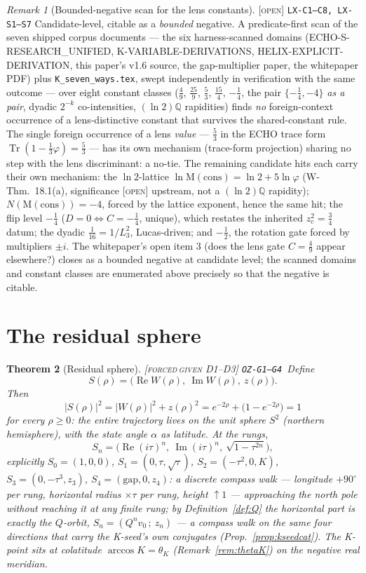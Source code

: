 \documentclass[11pt]{article}
\newcommand{\tagFD}{\textcolor{cF}{\textsc{[forced}}\,\textcolor{cD}{\textsc{given D1--D3]}}}
\newcommand{\tagO}{\textcolor{cO}{\textsc{[open]}}}
\newcommand{\hx}[1]{\textcolor{cC}{\footnotesize\texttt{#1}}}
\newcommand{\Q}{\mathbb{Q}}
\newcommand{\gp}{\varphi}
\newcommand{\gapc}{\mathrm{gap}}
\newcommand{\M}{\mathrm{M}}
\DeclareMathOperator{\Rea}{Re}
\DeclareMathOperator{\Ima}{Im}
\theoremstyle{plain}
\newtheorem{theorem}{Theorem}[section]
\theoremstyle{definition}
\theoremstyle{remark}
\newtheorem{remark}[theorem]{Remark}
\begin{document}
\begin{remark}[Bounded-negative scan for the lens constants]\label{rem:lensscan}\tagO{} \hx{LX-C1--C8, LX-S1--S7}
Candidate-level, citable as a \emph{bounded} negative. A predicate-first
scan of the seven shipped corpus documents --- the six harness-scanned
domains (ECHO-S-RESEARCH\_UNIFIED, K-VARIABLE-DERIVATIONS,
HELIX-EXPLICIT-DERIVATION, this paper's v1.6 source, the gap-multiplier
paper, the whitepaper PDF) plus \texttt{K\_seven\_ways.tex}, swept
independently in verification with the same outcome --- over eight constant
classes ($\tfrac49$, $\tfrac{25}9$, $\tfrac53$, $\tfrac{15}4$, $-\tfrac14$,
the pair $\{-\tfrac14,-4\}$ \emph{as a pair}, dyadic $2^{-k}$
co-intensities, $(\ln2)\Q$ rapidities) finds \emph{no} foreign-context
occurrence of a lens-distinctive constant that survives the
shared-constant rule. The single foreign occurrence of a lens \emph{value}
--- $\tfrac53$ in the ECHO trace form
$\operatorname{Tr}(1-\tfrac13\gp)=\tfrac53$ --- has its own mechanism
(trace-form projection) sharing no step with the lens discriminant: a
no-tie. The remaining candidate hits each carry their own mechanism: the
$\ln2$-lattice $\ln\M(\mathrm{cons})=\ln2+5\ln\gp$ (W-Thm.\ 18.1(a),
significance \tagO{} upstream, not a $(\ln2)\Q$ rapidity);
$N(\M(\mathrm{cons}))=-4$, forced by the lattice exponent, hence the same
hit; the flip level $-\tfrac14$ ($D=0\iff C=-\tfrac14$, unique), which
restates the inherited $z_c^2=\tfrac34$ datum; the dyadic
$\tfrac1{16}=1/L_3^2$, Lucas-driven; and $-\tfrac12$, the rotation gate
forced by multipliers $\pm i$. The whitepaper's open item 3 (does the lens
gate $C=\tfrac49$ appear elsewhere?) closes as a bounded negative at
candidate level; the scanned domains and constant classes are enumerated
above precisely so that the negative is citable.
\end{remark}

\section{The residual sphere}\label{sec:sphere}

\begin{theorem}[Residual sphere]\label{thm:sphere}\tagFD{}
\hx{OZ-G1--G4}\ Define
\[
S(\rho)=\bigl(\Rea W(\rho),\ \Ima W(\rho),\ z(\rho)\bigr).
\]
Then
\[
|S(\rho)|^2=|W(\rho)|^2+z(\rho)^2=e^{-2\rho}+\bigl(1-e^{-2\rho}\bigr)=1
\]
for every $\rho\ge0$:
the entire trajectory lives on the unit sphere $S^2$ (northern hemisphere), with
the state angle $\alpha$ as latitude. At the rungs,
\[
S_n=\bigl(\Rea(i\tau)^n,\ \Ima(i\tau)^n,\ \sqrt{1-\tau^{2n}}\bigr),
\]
explicitly $S_0=(1,0,0)$, $S_1=(0,\tau,\sqrt\tau)$,
$S_2=(-\tau^2,0,K)$, $S_3=(0,-\tau^3,z_3)$, $S_4=(\gapc,0,z_4)$: a discrete
compass walk --- longitude $+90^\circ$ per rung, horizontal radius $\times\tau$
per rung, height $\uparrow1$ --- approaching the north pole without reaching it
at any finite rung; by Definition~\ref{def:Q} the horizontal part is exactly
the $Q$-orbit, $S_n=(Q^nv_0\,;\ z_n)$ --- a compass walk on the same four
directions that carry the K-seed's own conjugates
(Prop.~\ref{prop:kseedcat}). The K-point sits at colatitude
$\arccos K=\theta_K$ (Remark~\ref{rem:thetaK}) on the negative real meridian.
\end{theorem}
\end{document}
